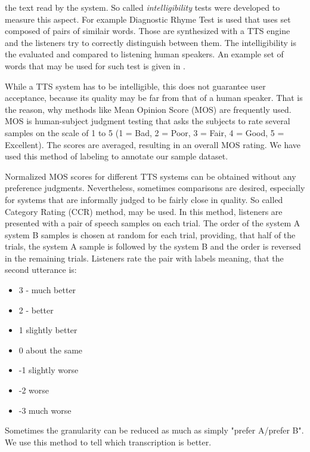 the text read by the system. So called \textit{intelligibility} tests were developed to measure this aspect.
For example Diagnostic Rhyme Test is used that uses set composed of pairs of similair words.
Those are synthesized with a TTS engine and the listeners try to correctly distinguish between them.
The intelligibility is the evaluated and compared to listening human speakers.
An example set of words that may be used for such test is given in .
\par
While a TTS system has to be intelligible, this does not guarantee user acceptance, because
its quality may be far from that of a human speaker.
That is the reason, why methods like Mean Opinion Score (MOS) are frequently used.
MOS is human-subject judgment testing that asks the subjects to rate several samples on the scale of 1 to 5 (1 = Bad, 2 = Poor, 3 = Fair, 4 = Good, 5 = Excellent).
The scores are averaged, resulting in an overall MOS rating.
We have used this method of labeling to annotate our sample dataset.
\par
Normalized MOS scores for different TTS systems can be obtained without any preference judgments.
Nevertheless, sometimes comparisons are desired, especially for systems that are informally judged to be fairly close in quality.
So called Category Rating (CCR) method, may be used.
In this method, listeners are presented with a pair of speech samples on each trial. The order of the system A system B samples is chosen at random for each trial, providing, that half of the trials, the system A sample is followed by the system B and the order is reversed in the remaining trials.
Listeners rate the pair with labels meaning, that the second utterance is:
\begin{itemize}
\item 3 - much better
\item 2 - better
\item 1 slightly better
\item 0 about the same
\item -1 slightly worse
\item -2 worse
\item -3 much worse
\end{itemize}
Sometimes the granularity can be reduced as much as simply "prefer A/prefer B".
We use this method to tell which transcription is better.
